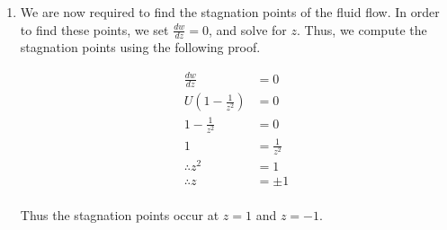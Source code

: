 \documentclass[a4paper]{article}
\begin{document}
\begin{enumerate}[label=\textbf{\arabic*.}]
\begin{enumerate}
\begin{enumerate}
			\bigbreak

			\item We are now required to find the stagnation points of the fluid flow. In order to find these points, we set $\displaystyle{\frac{dw}{dz}=0}$, and solve for $\displaystyle{z}$. Thus, we compute the stagnation points using the following proof.

			\begin{align*}
			\frac{dw}{dz} & = 0\\
			U\left(1 - \frac{1}{z^2}\right) & = 0\\
			1 - \frac{1}{z^2} & = 0\\
			1 & = \frac{1}{z^2}\\
			\therefore z^2 & = 1\\
			\therefore z & = \pm 1\\
			\end{align*}

			Thus the stagnation points occur at $\displaystyle{z = 1}$ and $\displaystyle{z = -1}$.


		\end{enumerate}


	\end{enumerate}

\end{enumerate}
\end{document}
